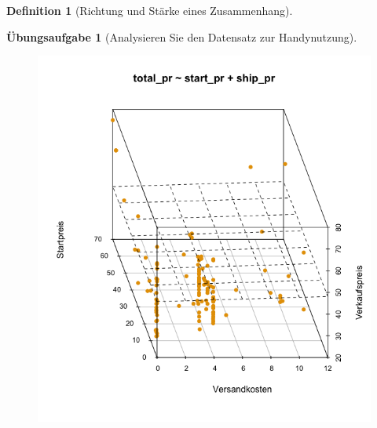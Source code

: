 \documentclass[
  a4paper,
  DIV=11]{scrreprt}
\theoremstyle{definition}
\newtheorem{exercise}{Übungsaufgabe}[chapter]
\theoremstyle{definition}
\theoremstyle{definition}
\newtheorem{definition}{Definition}[chapter]
\theoremstyle{remark}
\begin{document}
\begin{definition}[Richtung und Stärke eines
Zusammenhang]
\begin{exercise}[Analysieren Sie den Datensatz zur
Handynutzung]
\begin{figure}
\begin{minipage}{0.33\linewidth}
\end{minipage}%
%
\begin{minipage}{0.33\linewidth}

\includegraphics{img/3d_scatter_mario2.png}

\end{minipage}%
%
\begin{minipage}{0.33\linewidth}


\end{minipage}
\end{figure}
\end{exercise}
\end{definition}
\end{document}
